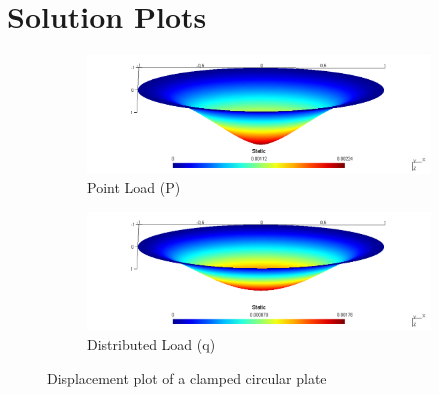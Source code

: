 \documentclass[main.tex]{subfiles}
\begin{document}
\chapter{Solution Plots}


\begin{figure}[h!]
\begin{subfigure}{1\textwidth}
\centering
\includegraphics[width=\linewidth,trim={0cm 0 0cm 0},clip]{images/appedix_sim_result/C_BI_P.png}
\caption{Point Load (P)}
\end{subfigure} \vfill
\begin{subfigure}{1\textwidth}
\includegraphics[width=\linewidth,trim={0cm 0 0cm 0},clip]{images/appedix_sim_result/C_BI_q.png}
\caption{Distributed Load (q)}
\end{subfigure}
\caption{Displacement plot of a clamped circular plate}
\end{figure}
\end{document}
